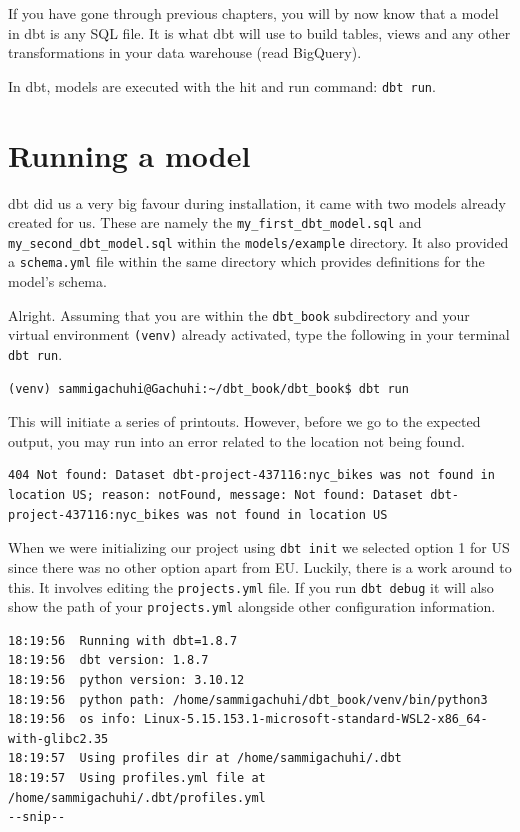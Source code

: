 \documentclass[
]{book}
\begin{document}
If you have gone through previous chapters, you will by now know that a model in dbt is any SQL file. It is what dbt will use to build tables, views and any other transformations in your data warehouse (read BigQuery).

In dbt, models are executed with the hit and run command: \texttt{dbt\ run}.

\hypertarget{running-a-model}{%
\section{Running a model}\label{running-a-model}}

dbt did us a very big favour during installation, it came with two models already created for us. These are namely the \texttt{my\_first\_dbt\_model.sql} and \texttt{my\_second\_dbt\_model.sql} within the \texttt{models/example} directory. It also provided a \texttt{schema.yml} file within the same directory which provides definitions for the model's schema.

Alright. Assuming that you are within the \texttt{dbt\_book} subdirectory and your virtual environment \texttt{(venv)} already activated, type the following in your terminal \texttt{dbt\ run}.

\begin{verbatim}
(venv) sammigachuhi@Gachuhi:~/dbt_book/dbt_book$ dbt run
\end{verbatim}

This will initiate a series of printouts. However, before we go to the expected output, you may run into an error related to the location not being found.

\begin{verbatim}
404 Not found: Dataset dbt-project-437116:nyc_bikes was not found in location US; reason: notFound, message: Not found: Dataset dbt-project-437116:nyc_bikes was not found in location US
\end{verbatim}

When we were initializing our project using \texttt{dbt\ init} we selected option 1 for US since there was no other option apart from EU. Luckily, there is a work around to this. It involves editing the \texttt{projects.yml} file. If you run \texttt{dbt\ debug} it will also show the path of your \texttt{projects.yml} alongside other configuration information.

\begin{verbatim}
18:19:56  Running with dbt=1.8.7
18:19:56  dbt version: 1.8.7
18:19:56  python version: 3.10.12
18:19:56  python path: /home/sammigachuhi/dbt_book/venv/bin/python3
18:19:56  os info: Linux-5.15.153.1-microsoft-standard-WSL2-x86_64-with-glibc2.35
18:19:57  Using profiles dir at /home/sammigachuhi/.dbt
18:19:57  Using profiles.yml file at /home/sammigachuhi/.dbt/profiles.yml
--snip--
\end{verbatim}
\end{document}
